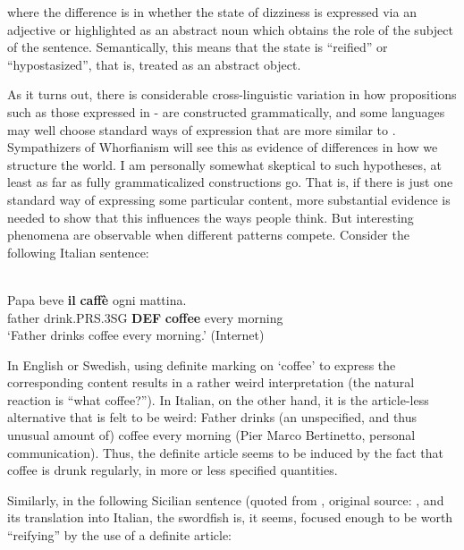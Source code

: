where the difference is in whether the state of dizziness is expressed via an adjective or highlighted as an abstract noun which obtains the role of the subject of the sentence. Semantically, this means that the state is “reified” or “hypostasized”, that is, treated as an abstract object. 

As it turns out, there is considerable cross-linguistic variation in how propositions such as those expressed in - are constructed grammatically, and some languages may well choose standard ways of expression that are more similar to . Sympathizers of Whorfianism will see this as evidence of differences in how we structure the world. I am personally somewhat skeptical to such hypotheses, at least as far as fully grammaticalized constructions go. That is, if there is just one standard way of expressing some particular content, more substantial evidence is needed to show that this influences the ways people think. But interesting phenomena are observable when different patterns compete. Consider the following Italian sentence:

\ea \label{} 
\\
\gll Papa  beve  \textbf{il} \textbf{caffè} ogni  mattina.\\
father  drink.PRS.3SG  \textbf{DEF} \textbf{coffee} every  morning\\
\glt ‘Father drinks coffee every morning.’ (Internet)

\z

In English or Swedish, using definite marking on ‘coffee’ to express the corresponding content results in a rather weird interpretation (the natural reaction is “what coffee?”). In Italian, on the other hand, it is the article-less alternative that is felt to be weird: Father drinks (an unspecified, and thus unusual amount of) coffee every morning (Pier Marco Bertinetto, personal communication). Thus, the definite article seems to be induced by the fact that coffee is drunk regularly, in more or less specified quantities. 

Similarly, in the following Sicilian sentence (quoted from \citet[413]{BertinettoEtAl2000}, original source: \citet[231]{Skubic1973-74}, and its translation into Italian, the swordfish is, it seems, focused enough to be worth “reifying” by the use of a definite article:


